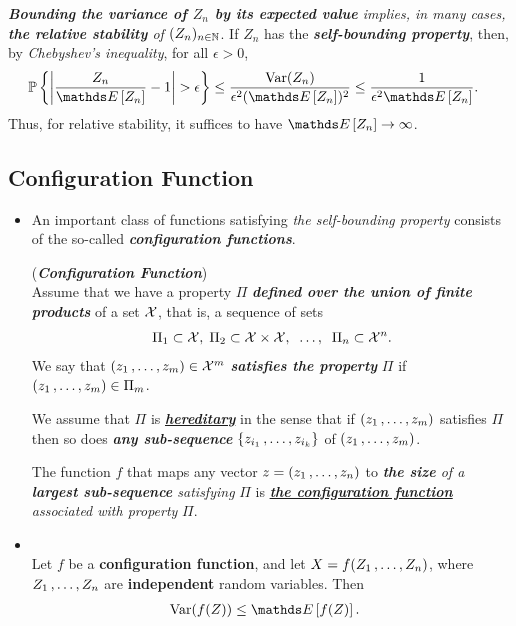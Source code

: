 \documentclass[11pt]{article}
\begin{document}
\begin{itemize}
\begin{remark}
\emph{\textbf{Bounding the variance of $Z_n$ by its expected value} implies, in many cases, \textbf{the relative stability} of $(Z_n)_{n\in {\mathbb N}}$}. If $Z_n$ has the
\emph{\textbf{self-bounding property}}, then, by \emph{Chebyshev's inequality}, for all $\epsilon > 0$,
\begin{align*}
\bP\set{\abs{\frac{Z_n}{\E{}{Z_n}} - 1} > \epsilon} &\le \frac{\text{Var}(Z_n)}{\epsilon^2 (\E{}{Z_n})^2} \le \frac{1}{\epsilon^2 \E{}{Z_n}}.
\end{align*}
Thus, for relative stability, it suffices to have $\E{}{Z_n} \to \infty$.
\end{remark}


\end{itemize}
\subsection{Configuration Function}
\begin{itemize}
\item An important class of functions satisfying \emph{the self-bounding property} consists of the so-called \emph{\textbf{configuration functions}}.
\begin{definition} (\emph{\textbf{Configuration Function}})\\
Assume that we have a property $\Pi$ \emph{\textbf{defined over the union of finite products}} of a set ${\mathcal X}$, that is, a sequence of sets 
\begin{align*}
\Pi_1 \subset {\mathcal X},\;  \Pi_2 \subset {\mathcal X} \times {\mathcal X}, \;\;\ldots,\;\; \Pi_n \subset {\mathcal X}^n.
\end{align*} We say that $(z_1 \,{,}\ldots{,}\, z_m) \in {\mathcal X}^m$ \emph{\textbf{satisfies the property}} $\Pi$ if $(z_1 \,{,}\ldots{,}\, z_m) \in \Pi_m$. 

We assume that $\Pi$ is \underline{\emph{\textbf{hereditary}}} in the sense that if $(z_1 \,{,}\ldots{,}\, z_m)$ satisfies $\Pi$ then so does \emph{\textbf{any sub-sequence}} $\left\{z_{i_1} \,{,}\ldots{,}\, z_{i_k}\right\}$ of $(z_1 \,{,}\ldots{,}\, z_m)$. 

The function $f$ that maps any vector $z = (z_1 \,{,}\ldots{,}\, z_n)$  to \emph{\textbf{the size} of a \textbf{largest sub-sequence} satisfying} $\Pi$ is \underline{\emph{\textbf{the configuration function}}} \emph{associated with property} $\Pi$.
\end{definition}

\item \begin{corollary} \citep{boucheron2013concentration}\\
Let $f$ be a \textbf{configuration function}, and let $X = f(Z_1 \,{,}\ldots{,}\, Z_n)$, where $Z_1 \,{,}\ldots{,}\, Z_n$ are \textbf{independent} random variables. Then
\begin{align*}
\text{Var}(f(Z)) &\le \E{}{f(Z)}.
\end{align*}
\end{corollary}
\end{itemize}
\end{document}
